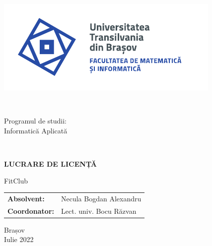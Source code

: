 \begin{titlepage}
	
	\vspace*{-3cm}
	\hspace{-2cm}
	
	\begin{minipage}{0.1\textwidth}\raggedleft
		\includegraphics[width=6.5\linewidth]{./images/Logo-UT-MI-SPOT-RO}
	\end{minipage}
	~
	\begin{minipage}{0.8\textwidth}\raggedleft
		Programul de studii:\\
		Informatică Aplicată
	\end{minipage}\\[1cm]
	
		\begin{center}
		\Huge
		
		\vspace{2cm}
		
		\textbf{LUCRARE DE LICENȚĂ}
		
		\vspace{1cm}
		
		\LARGE
		FitClub
		
		\vfill
		
		\Large
		\begin{tabular}{ll}
			\textbf{Absolvent:}&Necula Bogdan Alexandru\\
			\textbf{Coordonator:}&Lect. univ. Bocu Răzvan\\
		\end{tabular}
		
		\vfill
		
		\Large
		Brașov\\
		Iulie 2022
		
	\end{center}
\end{titlepage}
